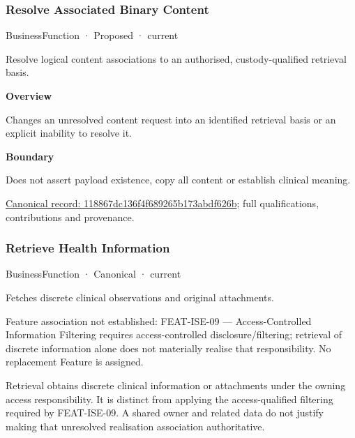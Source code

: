 \subsubsection{Resolve Associated Binary Content}

\label{element:118867dc136f4f689265b173abdf626b}
{\small BusinessFunction · Proposed · current}\par

Resolve logical content associations to an authorised, custody-qualified retrieval basis.



\textbf{Overview}



Changes an unresolved content request into an identified retrieval basis or an explicit inability to resolve it.



\textbf{Boundary}



Does not assert payload existence, copy all content or establish clinical meaning.


{\footnotesize \href{../../../../continuum/business/business-function/118867dc136f4f689265b173abdf626b.md}{Canonical record: 118867dc136f4f689265b173abdf626b}; full qualifications, contributions and provenance.}\par
\subsubsection{Retrieve Health Information}

\label{element:0afb265973744f6f9e95ee54e6ea5b77}
{\small BusinessFunction · Canonical · current}\par

Fetches discrete clinical observations and original attachments.



Feature association not established: FEAT-ISE-09 — Access-Controlled Information Filtering requires access-controlled disclosure/filtering; retrieval of discrete information alone does not materially realise that responsibility. No replacement Feature is assigned.



Retrieval obtains discrete clinical information or attachments under the owning access responsibility. It is distinct from applying the access-qualified filtering required by FEAT-ISE-09. A shared owner and related data do not justify making that unresolved realisation association authoritative.


